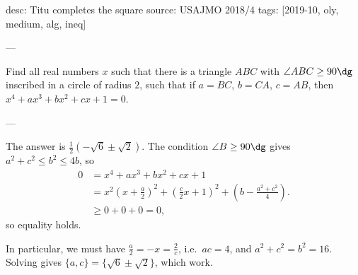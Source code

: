 desc: Titu completes the square
source: USAJMO 2018/4
tags: [2019-10, oly, medium, alg, ineq]

---

Find all real numbers $x$ such that there is a triangle $ABC$ with $\angle ABC\ge90\dg$ inscribed in a circle of radius $2$, such that if $a=BC$, $b=CA$, $c=AB$, then $x^4+ax^3+bx^2+cx+1=0$.

---

The answer is $\tfrac12(-\sqrt6\pm\sqrt2)$. The condition $\angle B\ge90\dg$ gives $a^2+c^2\le b^2\le4b$, so
\begin{align*}
0&=x^4+ax^3+bx^2+cx+1\\
&=x^2\left(x+\frac a2\right)^2+\left(\frac c2x+1\right)^2+\left(b-\frac{a^2+c^2}4\right).\\
&\ge0+0+0=0,
\end{align*}
so equality holds.

In particular, we must have $\frac a2=-x=\frac2c$, i.e.\ $ac=4$,
and $a^2+c^2=b^2=16$. Solving gives $\{a,c\}=\{\sqrt6\pm\sqrt2\}$, which work.

